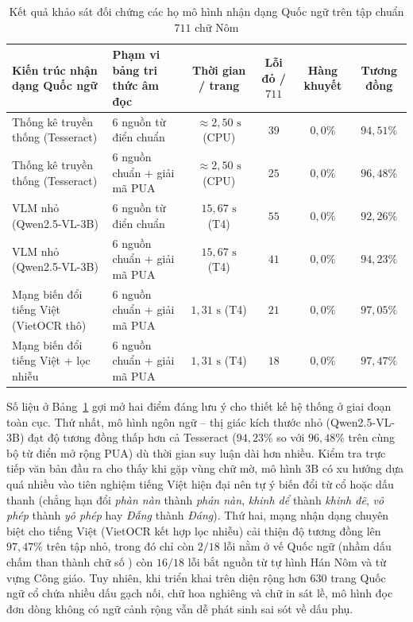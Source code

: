 \begin{table}[H]
    \centering
    \footnotesize
    \renewcommand{\arraystretch}{1.22}
    \begin{tabularx}{\textwidth}{X p{} c c c c}
        \toprule
        \textbf{Kiến trúc nhận dạng Quốc ngữ} & \textbf{Phạm vi bảng tri thức âm đọc} & \textbf{Thời gian / trang} & \textbf{Lỗi đỏ / $711$} & \textbf{Hàng khuyết} & \textbf{Tương đồng} \\
        \midrule
        Thống kê truyền thống (Tesseract) & $6$ nguồn từ điển chuẩn & $\approx 2{,}50\text{ s}$ (CPU) & $39$ & $0{,}0\%$ & $94{,}51\%$ \\
        Thống kê truyền thống (Tesseract) & $6$ nguồn chuẩn + giải mã PUA & $\approx 2{,}50\text{ s}$ (CPU) & $25$ & $0{,}0\%$ & $96{,}48\%$ \\
        VLM nhỏ (Qwen2.5-VL-3B) & $6$ nguồn từ điển chuẩn & $15{,}67\text{ s}$ (T4) & $55$ & $0{,}0\%$ & $92{,}26\%$ \\
        VLM nhỏ (Qwen2.5-VL-3B) & $6$ nguồn chuẩn + giải mã PUA & $15{,}67\text{ s}$ (T4) & $41$ & $0{,}0\%$ & $94{,}23\%$ \\
        Mạng biến đổi tiếng Việt (VietOCR thô) & $6$ nguồn chuẩn + giải mã PUA & $1{,}31\text{ s}$ (T4) & $21$ & $0{,}0\%$ & $97{,}05\%$ \\
        Mạng biến đổi tiếng Việt + lọc nhiễu & $6$ nguồn chuẩn + giải mã PUA & $1{,}31\text{ s}$ (T4) & $18$ & $0{,}0\%$ & $97{,}47\%$ \\
        \bottomrule
    \end{tabularx}
    \caption{Kết quả khảo sát đối chứng các họ mô hình nhận dạng Quốc ngữ trên tập chuẩn $711$ chữ Nôm}
    \label{tab:stage1_bench}
\end{table}

Số liệu ở Bảng~\ref{tab:stage1_bench} gợi mở hai điểm đáng lưu ý cho thiết kế hệ thống ở giai đoạn toàn cục. Thứ nhất, mô hình ngôn ngữ -- thị giác kích thước nhỏ (Qwen2.5-VL-3B) đạt độ tương đồng thấp hơn cả Tesseract ($94{,}23\%$ so với $96{,}48\%$ trên cùng bộ từ điển mở rộng PUA) dù thời gian suy luận dài hơn nhiều. Kiểm tra trực tiếp văn bản đầu ra cho thấy khi gặp vùng chữ mờ, mô hình $3\text{B}$ có xu hướng dựa quá nhiều vào tiên nghiệm tiếng Việt hiện đại nên tự ý biến đổi từ cổ hoặc dấu thanh (chẳng hạn đổi \textit{phàn nàn} thành \textit{phản nàn}, \textit{khinh dể} thành \textit{khinh đẽ}, \textit{vô phép} thành \textit{yô phép} hay \textit{Đấng} thành \textit{Đáng}). Thứ hai, mạng nhận dạng chuyên biệt cho tiếng Việt (VietOCR kết hợp lọc nhiễu) cải thiện độ tương đồng lên $97{,}47\%$ trên tập nhỏ, trong đó chỉ còn $2/18$ lỗi nằm ở vế Quốc ngữ (nhầm dấu chấm than \code{!} thành chữ số ) còn $16/18$ lỗi bắt nguồn từ tự hình Hán Nôm và từ vựng Công giáo. Tuy nhiên, khi triển khai trên diện rộng hơn $630$ trang Quốc ngữ cổ chứa nhiều dấu gạch nối, chữ hoa nghiêng và chữ in sát lề, mô hình đọc đơn dòng không có ngữ cảnh rộng vẫn dễ phát sinh sai sót về dấu phụ.

